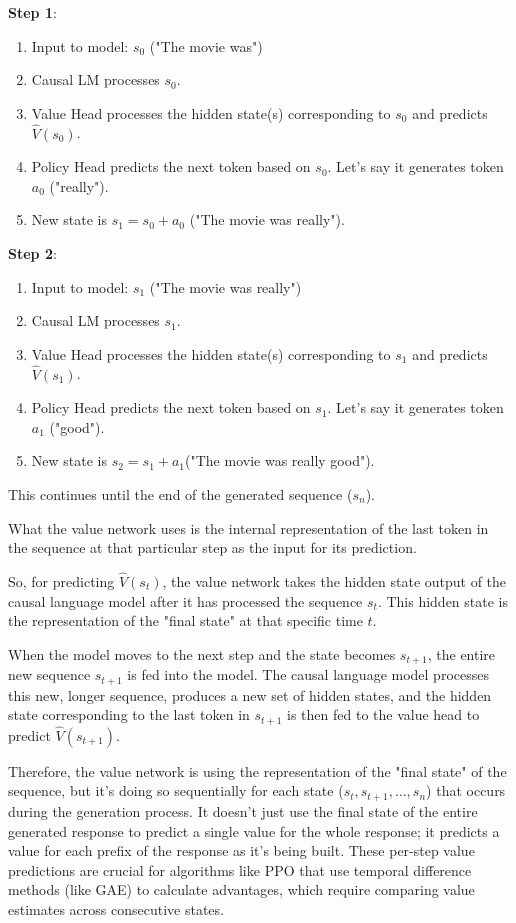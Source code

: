 \documentclass[10pt,a4paper]{report}
\begin{document}
\textbf{Step 1}:
\begin{enumerate}
\item    Input to model: $s_0$ ("The movie was")
\item    Causal LM processes $s_0$.
\item    Value Head processes the hidden state(s) corresponding to $s_0$ and predicts $\hat{V}(s_0)$.
\item    Policy Head predicts the next token based on $s_0$. Let's say it generates token $a_0$ ("really").
\item    New state is $s_1 = s_0 + a_0$ ("The movie was really").
\end{enumerate}
\textbf{Step 2}:
\begin{enumerate}
\item    Input to model: $s_1$ ("The movie was really")
\item    Causal LM processes $s_1$.
\item    Value Head processes the hidden state(s) corresponding to $s_1$ and predicts $\hat{V}(s_1)$.
\item    Policy Head predicts the next token based on $s_1$. Let's say it generates token $a_1$ ("good").
\item    New state is $s_2 = s_1 + a_1$("The movie was really good").
\end{enumerate}
This continues until the end of the generated sequence ($s_n$).

What the value network uses is the internal representation of the last token in the sequence at that particular step as the input for its prediction.

So, for predicting $\hat{V}(s_t)$, the value network takes the hidden state output of the causal language model after it has processed the sequence $s_t$. This hidden state is the representation of the "final state" at that specific time $t$.

When the model moves to the next step and the state becomes $s_{t+1}$, the entire new sequence $s_{t+1}$ is fed into the model. The causal language model processes this new, longer sequence, produces a new set of hidden states, and the hidden state corresponding to the last token in $s_{t+1}$ is then fed to the value head to predict $\hat{V}(s_{t+1})$.

Therefore, the value network is using the representation of the "final state" of the sequence, but it's doing so sequentially for each state ($s_t, s_{t+1}, \dots, s_n$) that occurs during the generation process. It doesn't just use the final state of the entire generated response to predict a single value for the whole response; it predicts a value for each prefix of the response as it's being built. These per-step value predictions are crucial for algorithms like PPO that use temporal difference methods (like GAE) to calculate advantages, which require comparing value estimates across consecutive states.
\end{document}
